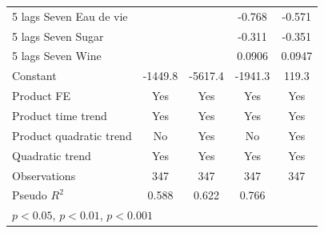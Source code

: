 \documentclass[12pt,a4paper,titlepage]{article}
\begin{document}
{\begin{longtable}{l*{4}{c}}
5 lags Seven Eau de vie&                     &                     &      -0.768\sym{***}&      -0.571         \\
5 lags Seven Sugar  &                     &                     &      -0.311\sym{***}&      -0.351\sym{***}\\
5 lags Seven Wine   &                     &                     &      0.0906         &      0.0947         \\
Constant            &     -1449.8\sym{***}&     -5617.4\sym{***}&     -1941.3\sym{***}&       119.3         \\
Product FE          &         Yes         &         Yes         &         Yes         &         Yes         \\
Product time trend  &         Yes         &         Yes         &         Yes         &         Yes         \\
Product quadratic trend&          No         &         Yes         &          No         &         Yes         \\
Quadratic trend     &         Yes         &         Yes         &         Yes         &         Yes         \\
\midrule
Observations        &         347         &         347         &         347         &         347         \\
Pseudo \(R^{2}\)    &       0.588         &       0.622         &       0.766         &                     \\
\bottomrule
\multicolumn{5}{l}{\footnotesize \sym{*} \(p<0.05\), \sym{**} \(p<0.01\), \sym{***} \(p<0.001\)}\\
\end{longtable}
}





\newpage
\end{document}
